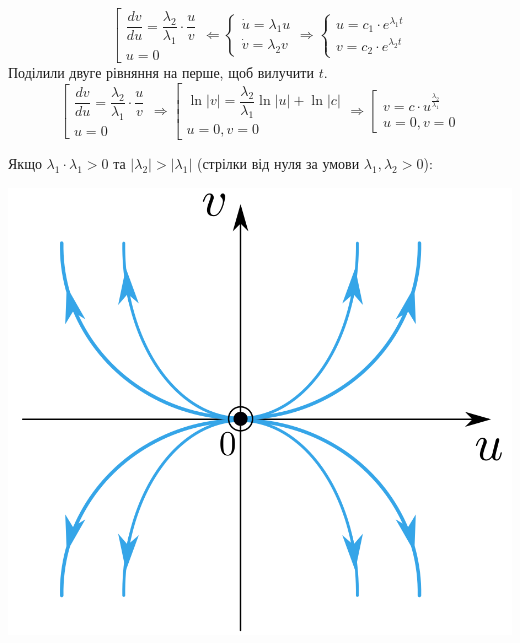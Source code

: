 

$$
\left[ \begin{array}{l}
    \dfrac{dv}{du} = \dfrac{\lambda_2}{\lambda_1} \cdot \dfrac{u}{v}\\
    u = 0
\end{array} \right.
\Longleftarrow
\begin{cases}
    \dot{u} = \lambda_1 u \\
    \dot{v} = \lambda_2 v
\end{cases} \Longrightarrow
\begin{cases}
    u = c_1 \cdot e^{\lambda_1 t}\\
    v = c_2 \cdot e^{\lambda_2 t}
\end{cases}
$$
Поділили двуге рівняння на перше, щоб вилучити $t$.
$$
\left[ \begin{array}{l}
    \dfrac{dv}{du} = \dfrac{\lambda_2}{\lambda_1} \cdot \dfrac{u}{v}\\
    u = 0
\end{array} \right. \Longrightarrow \left[ \begin{array}{l}
    \ln{ \left| v \right| } = \dfrac{\lambda_2}{\lambda_1} \ln{ \left| u \right| } + \ln{ \left| c \right| } \\
    u = 0, v = 0
\end{array} \right. \Longrightarrow
\left[ \begin{array}{l}
    v = c  \cdot u^{ \frac{\lambda_2}{\lambda_1} }\\
    u = 0, v = 0
\end{array} \right.
$$

Якщо $ \lambda_1 \cdot \lambda_1 > 0 $ та $ \left| \lambda_2 \right| > \left| \lambda_1 \right|  $ (стрілки від нуля за умови $
 \lambda_1, \lambda_2 > 0$):

\begin{center} \includegraphics[scale=0.3]{assets/lectures_recent-b13d607a.png} \end{center}


